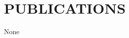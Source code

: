 \documentclass[a4paper,9pt]{extarticle}
\begin{document}



\section*{PUBLICATIONS}
None
\end{document}
